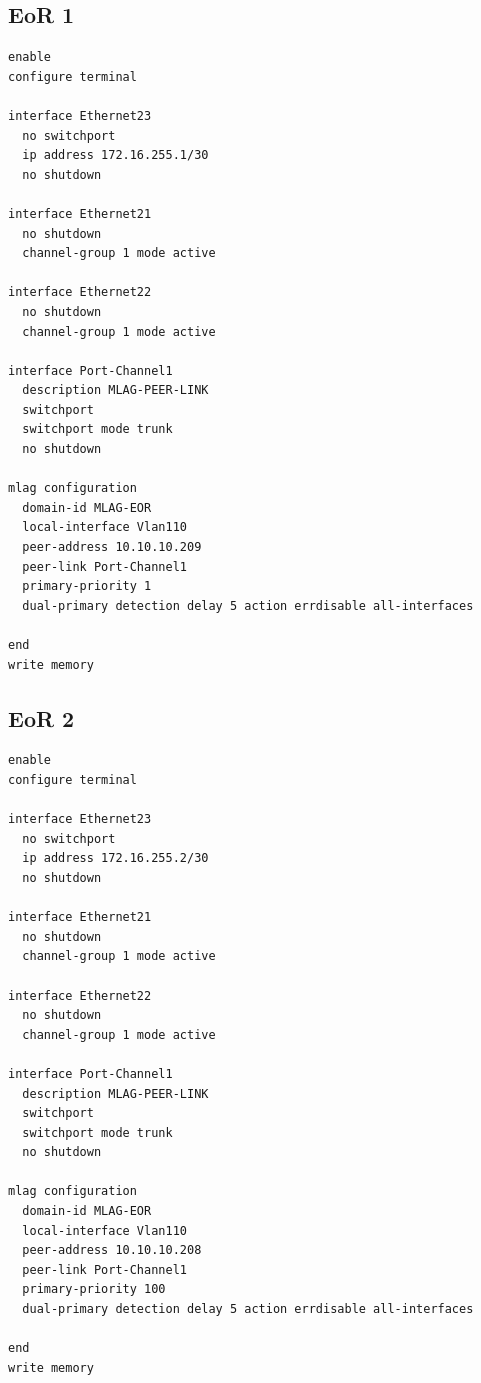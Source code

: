 \subsection{EoR 1}
\begin{lstlisting}[caption={EoR 1: MLAG peer-link and domain configuration.},basicstyle=\ttfamily\footnotesize,breaklines=true]
enable
configure terminal

interface Ethernet23
  no switchport
  ip address 172.16.255.1/30
  no shutdown

interface Ethernet21
  no shutdown
  channel-group 1 mode active

interface Ethernet22
  no shutdown
  channel-group 1 mode active

interface Port-Channel1
  description MLAG-PEER-LINK
  switchport
  switchport mode trunk
  no shutdown

mlag configuration
  domain-id MLAG-EOR
  local-interface Vlan110
  peer-address 10.10.10.209
  peer-link Port-Channel1
  primary-priority 1
  dual-primary detection delay 5 action errdisable all-interfaces

end
write memory
\end{lstlisting}

\subsection{EoR 2}
\begin{lstlisting}[caption={EoR 2: MLAG peer-link and domain configuration.},basicstyle=\ttfamily\footnotesize,breaklines=true]
enable
configure terminal

interface Ethernet23
  no switchport
  ip address 172.16.255.2/30
  no shutdown

interface Ethernet21
  no shutdown
  channel-group 1 mode active

interface Ethernet22
  no shutdown
  channel-group 1 mode active

interface Port-Channel1
  description MLAG-PEER-LINK
  switchport
  switchport mode trunk
  no shutdown

mlag configuration
  domain-id MLAG-EOR
  local-interface Vlan110
  peer-address 10.10.10.208
  peer-link Port-Channel1
  primary-priority 100
  dual-primary detection delay 5 action errdisable all-interfaces

end
write memory
\end{lstlisting}

